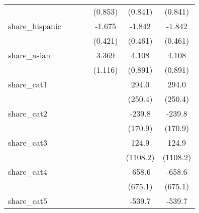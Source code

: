 {\begin{tabular}{l*{6}{c}}
            &                     &                     &                     &     (0.853)         &     (0.841)         &     (0.841)         \\
[1em]
share\_hispanic&                     &                     &                     &      -1.675\sym{***}&      -1.842\sym{***}&      -1.842\sym{***}\\
            &                     &                     &                     &     (0.421)         &     (0.461)         &     (0.461)         \\
[1em]
share\_asian &                     &                     &                     &       3.369\sym{**} &       4.108\sym{***}&       4.108\sym{***}\\
            &                     &                     &                     &     (1.116)         &     (0.891)         &     (0.891)         \\
[1em]
share\_cat1  &                     &                     &                     &                     &       294.0         &       294.0         \\
            &                     &                     &                     &                     &     (250.4)         &     (250.4)         \\
[1em]
share\_cat2  &                     &                     &                     &                     &      -239.8         &      -239.8         \\
            &                     &                     &                     &                     &     (170.9)         &     (170.9)         \\
[1em]
share\_cat3  &                     &                     &                     &                     &       124.9         &       124.9         \\
            &                     &                     &                     &                     &    (1108.2)         &    (1108.2)         \\
[1em]
share\_cat4  &                     &                     &                     &                     &      -658.6         &      -658.6         \\
            &                     &                     &                     &                     &     (675.1)         &     (675.1)         \\
[1em]
share\_cat5  &                     &                     &                     &                     &      -539.7         &      -539.7         \\

\end{tabular}}
